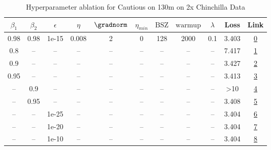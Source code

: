 \begin{table}[H]
\centering
\caption{Hyperparameter ablation for Cautious on 130m on 2x Chinchilla Data}
\label{tab:ablation_cautious_130m_on_2x_chinchilla_data}
\begin{tabular}{ccccccccccc}
\toprule
$\beta_1$ & $\beta_2$ & $\epsilon$ & $\eta$ & $\gradnorm$ & $\eta_{min}$ & $\mathrm{BSZ}$ & $\mathrm{warmup}$ & $\lambda$ & Loss & Link \\
\midrule
0.98 & 0.98 & 1e-15 & 0.008 & 2 & 0 & 128 & 2000 & 0.1 & 3.403 & \href{https://wandb.ai/stanford-mercury/optimizer-scaling/runs/sweep-130m-5B-cautiousce8123lr0.008-wd0.1-minlr0-warmup2000-b10.-fd1867}{0} \\
\midrule
0.8 & -- & -- & -- & -- & -- & -- & -- & -- & 7.417 & \href{https://wandb.ai/stanford-mercury/optimizer-scaling/runs/sweep-130m-5B-cautious4f3b8flr0.008-wd0.1-minlr0-warmup2000-b10.-ef7ead}{1} \\
0.9 & -- & -- & -- & -- & -- & -- & -- & -- & 3.427 & \href{https://wandb.ai/stanford-mercury/optimizer-scaling/runs/sweep-130m-5B-cautious585d63lr0.008-wd0.1-minlr0-warmup2000-b10.-6158ce}{2} \\
0.95 & -- & -- & -- & -- & -- & -- & -- & -- & 3.413 & \href{https://wandb.ai/stanford-mercury/optimizer-scaling/runs/sweep-130m-5B-cautious5d7675lr0.008-wd0.1-minlr0-warmup2000-b10.-76a83d}{3} \\
-- & 0.9 & -- & -- & -- & -- & -- & -- & -- & >10 & \href{https://wandb.ai/stanford-mercury/optimizer-scaling/runs/sweep-130m-5B-cautious6aa3ablr0.008-wd0.1-minlr0-warmup2000-b10.-752115}{4} \\
-- & 0.95 & -- & -- & -- & -- & -- & -- & -- & 3.408 & \href{https://wandb.ai/stanford-mercury/optimizer-scaling/runs/sweep-130m-5B-cautious35372elr0.008-wd0.1-minlr0-warmup2000-b10.-681c2f}{5} \\
-- & -- & 1e-25 & -- & -- & -- & -- & -- & -- & 3.404 & \href{https://wandb.ai/stanford-mercury/optimizer-scaling/runs/sweep-130m-5B-cautiousedcc52lr0.008-wd0.1-minlr0-warmup2000-b10.-57f831}{6} \\
-- & -- & 1e-20 & -- & -- & -- & -- & -- & -- & 3.404 & \href{https://wandb.ai/stanford-mercury/optimizer-scaling/runs/sweep-130m-5B-cautious8f8214lr0.008-wd0.1-minlr0-warmup2000-b10.-b716f2}{7} \\
-- & -- & 1e-10 & -- & -- & -- & -- & -- & -- & 3.404 & \href{https://wandb.ai/stanford-mercury/optimizer-scaling/runs/sweep-130m-5B-cautious78002elr0.008-wd0.1-minlr0-warmup2000-b10.-a041fe}{8} \\

\end{tabular}
\end{table}
